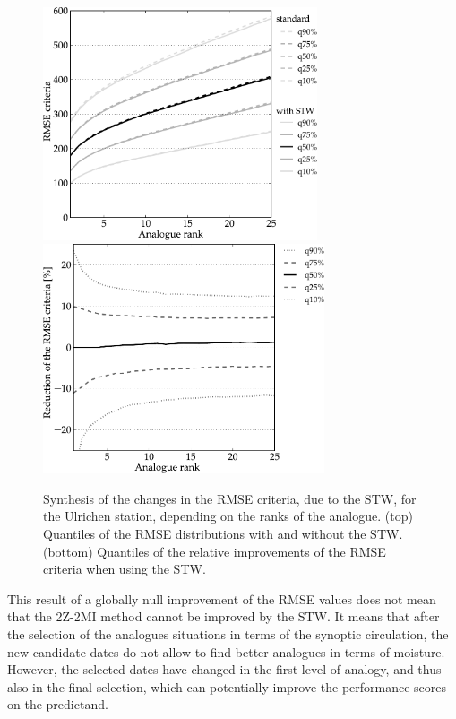 \documentclass[hess]{copernicus}
\begin{document}
\begin{figure}[htb]
	\begin{center}
		\includegraphics[width=8.1cm]{figures/changes_RMSE_value.pdf} \\
		\includegraphics[width=8.3cm]{figures/changes_RMSE_gain.pdf}
	\end{center}
	\caption{Synthesis of the changes in the RMSE criteria, due to the STW, for the Ulrichen station, depending on the ranks of the analogue. (top) Quantiles of the RMSE distributions with and without the STW. (bottom) Quantiles of the relative improvements of the RMSE criteria when using the STW.}
	\label{fig:changes_RMSE}
\end{figure}

This result of a globally null improvement of the RMSE values does not mean that the 2Z-2MI method cannot be improved by the STW. It means that after the selection of the analogues situations in terms of the synoptic circulation, the new candidate dates do not allow to find better analogues in terms of moisture. However, the selected dates have changed in the first level of analogy, and thus also in the final selection, which can potentially improve the performance scores on the predictand.
\end{document}
